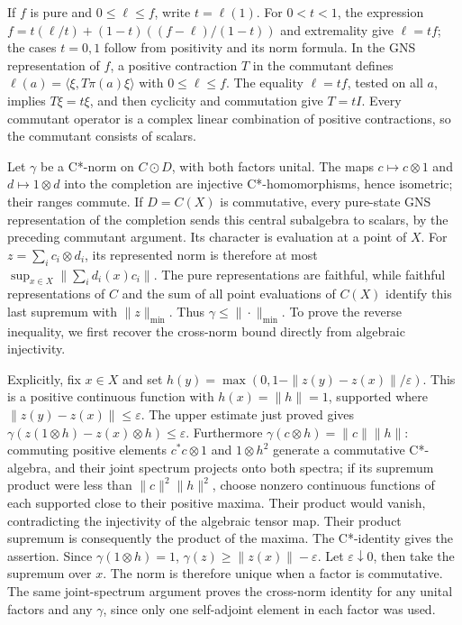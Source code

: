 \documentclass[
  11pt,
]{article}
\begin{document}
If \(f\) is pure and \(0\leq\ell\leq f\), write \(t=\ell(1)\). For
\(0<t<1\), the expression \(f=t(\ell/t)+(1-t)((f-\ell)/(1-t))\) and
extremality give \(\ell=tf\); the cases \(t=0,1\) follow from positivity
and its norm formula. In the GNS representation of \(f\), a positive
contraction \(T\) in the commutant defines
\(\ell(a)=\langle\xi,T\pi(a)\xi\rangle\) with \(0\leq\ell\leq f\). The
equality \(\ell=tf\), tested on all \(a\), implies \(T\xi=t\xi\), and
then cyclicity and commutation give \(T=tI\). Every commutant operator
is a complex linear combination of positive contractions, so the
commutant consists of scalars.

Let \(\gamma\) be a C*-norm on \(C\odot D\), with both factors unital.
The maps \(c\mapsto c\otimes1\) and \(d\mapsto1\otimes d\) into the
completion are injective C*-homomorphisms, hence isometric; their ranges
commute. If \(D=C(X)\) is commutative, every pure-state GNS
representation of the completion sends this central subalgebra to
scalars, by the preceding commutant argument. Its character is
evaluation at a point of \(X\). For \(z=\sum_i c_i\otimes d_i\), its
represented norm is therefore at most
\(\sup_{x\in X}\|\sum_i d_i(x)c_i\|\). The pure representations are
faithful, while faithful representations of \(C\) and the sum of all
point evaluations of \(C(X)\) identify this last supremum with
\(\|z\|_{\min}\). Thus \(\gamma\leq\|\cdot\|_{\min}\). To prove the
reverse inequality, we first recover the cross-norm bound directly from
algebraic injectivity.

Explicitly, fix \(x\in X\) and set
\(h(y)=\max(0,1-\|z(y)-z(x)\|/\varepsilon)\). This is a positive
continuous function with \(h(x)=\|h\|=1\), supported where
\(\|z(y)-z(x)\|\leq\varepsilon\). The upper estimate just proved gives
\(\gamma(z(1\otimes h)-z(x)\otimes h)\leq\varepsilon\). Furthermore
\(\gamma(c\otimes h)=\|c\|\|h\|\): commuting positive elements
\(c^*c\otimes1\) and \(1\otimes h^2\) generate a commutative C*-algebra,
and their joint spectrum projects onto both spectra; if its supremum
product were less than \(\|c\|^2\|h\|^2\), choose nonzero continuous
functions of each supported close to their positive maxima. Their
product would vanish, contradicting the injectivity of the algebraic
tensor map. Their product supremum is consequently the product of the
maxima. The C*-identity gives the assertion. Since
\(\gamma(1\otimes h)=1\), \(\gamma(z)\geq\|z(x)\|-\varepsilon\). Let
\(\varepsilon\downarrow0\), then take the supremum over \(x\). The norm
is therefore unique when a factor is commutative. The same
joint-spectrum argument proves the cross-norm identity for any unital
factors and any \(\gamma\), since only one self-adjoint element in each
factor was used.
\end{document}
